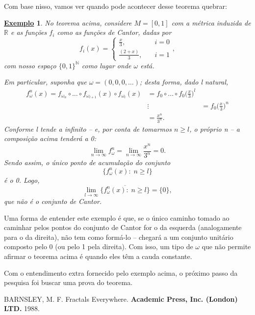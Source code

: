 \documentclass[12pt]{article}
\newtheorem{example}{\underline{Exemplo}}
\theoremstyle{definition}
\begin{document}
Com base nisso, vamos ver quando pode acontecer desse teorema quebrar: 
\begin{example}
  No teorema acima, considere \(M=[0,1]\) com a métrica induzida de \(\mathbb{R}\) e as funções \(f_{i}\) como as funções de Cantor, dadas por 
    \[
      f_{i}(x) = \left\{\begin{array}{ll}
          \frac{x}{3},&\quad i=0\\ 
          \frac{(2+x)}{3},&\quad i=1
        \end{array}\right.,
    \]
    com nosso espaço \(\{0,1\}^{\mathbb{N}}\) como lugar onde \(\omega \) está.

    Em particular, suponha que \(\omega =(0,0,0,\dotsc )\); desta forma, dado l natural, 
   \begin{align*}
     f_{\omega }^{n}(x)=f_{\omega_{n}}\circ \dotsc \circ f_{\omega_{l+1}}(x)\circ f_{\omega_{l}}(x)&=f_{0}\circ \dotsc \circ f_{0}\biggl(\frac{x}{3}\biggr)^{l}\\ 
                                                                                                   &\vdots
                                                                                                   &=f_{0}\biggl(\frac{x}{3}\biggr)^{n}\\ 
                                                                                                   &= \frac{x^{n}}{3^{n}}.
   \end{align*}
   Conforme l tende a infinito -- e, por conta de tomarmos \(n\geq l\), o próprio n -- a composição acima tenderá a 0: 
     \[
       \lim_{n\to \infty}f_{\omega}^{n} = \lim_{n\to \infty}\frac{x^{n}}{3^{n}}= 0.
     \]
     Sendo assim, o único ponto de acumulação do conjunto 
       \[
         \{f_{\omega }^{n}(x):\; n\geq l\}
       \]
       é o 0. Logo, 
         \[
           \lim_{l\to \infty}\overline{\{f_{\omega }^{n}(x):\; n\geq l\}}=\{0\},
         \]
         que não é o conjunto de Cantor. 
\end{example}
Uma forma de entender este exemplo é que, se o único caminho tomado ao caminhar pelos pontos do conjunto de Cantor for o da esquerda (analogamente para o da direita), não tem como formá-lo -- chegará a um conjunto unitário composto pelo 0 (ou pelo 1 pela direita). Com isso, um tipo de \(\omega \) que não permite afirmar o teorema acima é quando eles têm a cauda constante.

Com o entendimento extra fornecido pelo exemplo acima, o próximo passo da pesquisa foi buscar uma prova do teorema. 

\begin{thebibliography}{99}
	 BARNSLEY, M. F. Fractals Everywhere. \textbf{Academic Press, Inc. (London) LTD.} 1988.
\end{thebibliography}
\end{document}

